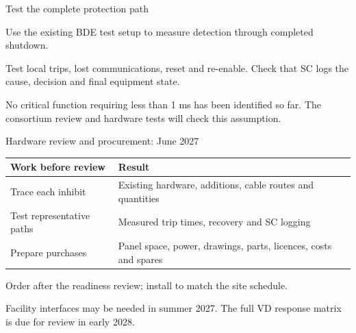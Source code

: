 \documentclass[aspectratio=169,11pt]{beamer}
\begin{document}
\begin{frame}{Test the complete protection path}
\centering
{}\par\bigskip
\raggedright

Use the existing BDE test setup to measure detection through completed shutdown.\par\medskip
Test local trips, lost communications, reset and re-enable. Check that SC logs the cause, decision and final equipment state.\par\bigskip
No critical function requiring less than 1 ms has been identified so far. The consortium review and hardware tests will check this assumption.
\end{frame}

\begin{frame}{Hardware review and procurement: June 2027}
\renewcommand{\arraystretch}{1.45}
\begin{tabularx}{\textwidth}{@{}>{\RaggedRight\arraybackslash}p{3.4cm}>{\RaggedRight\arraybackslash}X@{}}
\toprule
\textbf{Work before review} & \textbf{Result}\\\midrule
Trace each inhibit & Existing hardware, additions, cable routes and quantities\\
Test representative paths & Measured trip times, recovery and SC logging\\
Prepare purchases & Panel space, power, drawings, parts, licences, costs and spares\\
\bottomrule
\end{tabularx}\par\bigskip
Order after the readiness review; install to match the site schedule.\par\medskip
Facility interfaces may be needed in summer 2027. The full VD response matrix is due for review in early 2028.
\end{frame}
\end{document}
